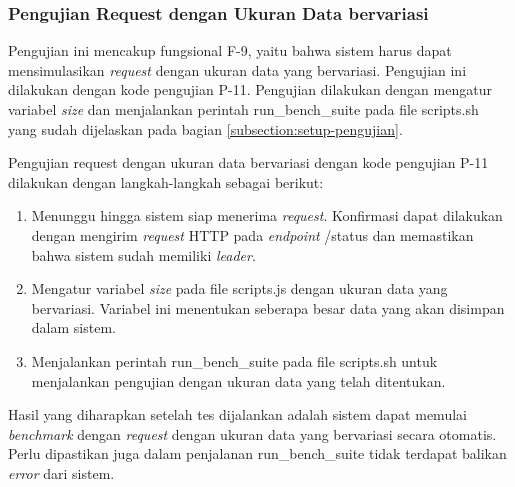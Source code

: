 \subsubsection{Pengujian Request dengan Ukuran Data bervariasi}
\label{subsubsection:pengujian-request-ukuran-data}

Pengujian ini mencakup fungsional F-9, yaitu bahwa sistem harus dapat mensimulasikan \textit{request} dengan ukuran data yang bervariasi. Pengujian ini dilakukan dengan kode pengujian P-11. Pengujian dilakukan dengan mengatur variabel \textit{size} dan menjalankan perintah run\_bench\_suite pada file scripts.sh yang sudah dijelaskan pada bagian \ref{subsection:setup-pengujian}.

Pengujian request dengan ukuran data bervariasi dengan kode pengujian P-11 dilakukan dengan langkah-langkah sebagai berikut:
\begin{enumerate}
    \item Menunggu hingga sistem siap menerima \textit{request}. Konfirmasi dapat dilakukan dengan mengirim \textit{request} HTTP pada \textit{endpoint} /status dan memastikan bahwa sistem sudah memiliki \textit{leader}.
    \item Mengatur variabel \textit{size} pada file scripts.js dengan ukuran data yang bervariasi. Variabel ini menentukan seberapa besar data yang akan disimpan dalam sistem.
    \item Menjalankan perintah run\_bench\_suite pada file scripts.sh untuk menjalankan pengujian dengan ukuran data yang telah ditentukan.
\end{enumerate}

Hasil yang diharapkan setelah tes dijalankan adalah sistem dapat memulai \textit{benchmark} dengan \textit{request} dengan ukuran data yang bervariasi secara otomatis. Perlu dipastikan juga dalam penjalanan run\_bench\_suite tidak terdapat balikan \textit{error} dari sistem.